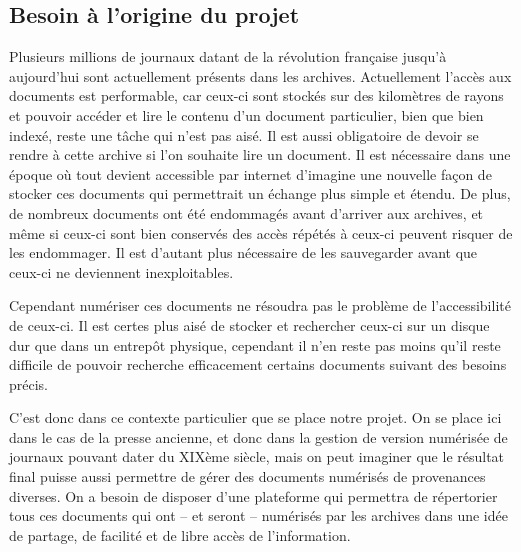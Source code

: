     \subsection{Besoin à l'origine du projet}
    \label{subsec:besoin}
    Plusieurs millions de journaux datant de la révolution française jusqu’à aujourd’hui sont
    actuellement présents dans les archives. Actuellement l’accès aux documents est performable,
    car ceux-ci sont stockés sur des kilomètres de rayons et pouvoir accéder et lire le contenu
    d’un document particulier, bien que bien indexé, reste une tâche qui n’est pas aisé.
    Il est aussi obligatoire de devoir se rendre à cette archive si l’on souhaite lire un document.
    Il est nécessaire dans une époque où tout devient accessible par internet d’imagine une nouvelle
    façon de stocker ces documents qui permettrait un échange plus simple et étendu. De plus,
    de nombreux documents ont été endommagés avant d’arriver aux archives, et même si ceux-ci
    sont bien conservés des accès répétés à ceux-ci peuvent risquer de les endommager. Il est d’autant
    plus nécessaire de les sauvegarder avant que ceux-ci ne deviennent inexploitables.

    Cependant numériser ces documents ne résoudra pas le problème de l’accessibilité de ceux-ci.
    Il est certes plus aisé de stocker et rechercher ceux-ci sur un disque dur que dans un entrepôt physique,
    cependant il n’en reste pas moins qu’il reste difficile de pouvoir recherche efficacement certains documents suivant des besoins précis.

    C’est donc dans ce contexte particulier que se place notre projet. On se place ici dans
    le cas de la presse ancienne, et donc dans la gestion de version numérisée de journaux pouvant
    dater du XIXème siècle, mais on peut imaginer que le résultat final puisse aussi permettre de gérer
    des documents numérisés de provenances diverses. On a besoin de disposer d’une plateforme qui permettra
    de répertorier tous ces documents qui ont – et seront – numérisés par les archives dans une idée de partage,
    de facilité et de libre accès de l’information.
